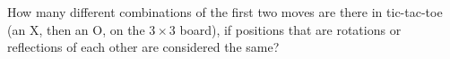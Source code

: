 How many different combinations of the first two moves are there in tic-tac-toe (an X, then an O, on the $3\times3$ board), if positions that are rotations or reflections of each other are considered the same?
